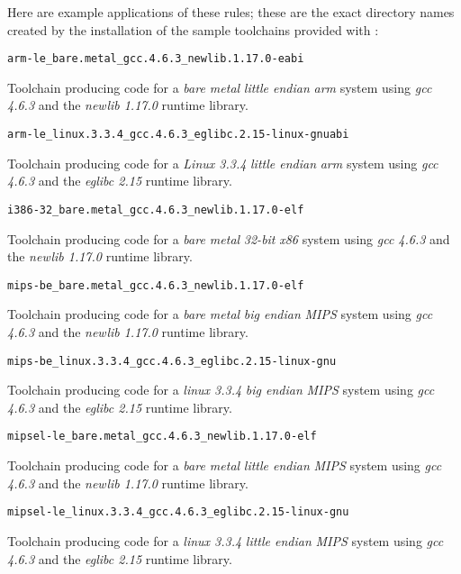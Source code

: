 Here are example applications of these rules; these are the exact
directory names created by the installation of the sample toolchains
provided with \lmsbw:

\begin{description}
\item{\texttt{arm-le\_bare.metal\_gcc.4.6.3\_newlib.1.17.0-eabi}}

  Toolchain producing code for a \emph{bare metal} \emph{little
    endian} \emph{arm} system using \emph{gcc 4.6.3} and the
  \emph{newlib 1.17.0} runtime library.

\item{\texttt{arm-le\_linux.3.3.4\_gcc.4.6.3\_eglibc.2.15-linux-gnuabi}}

  Toolchain producing code for a \emph{Linux 3.3.4} \emph{little
    endian} \emph{arm} system using \emph{gcc 4.6.3} and the
  \emph{eglibc 2.15} runtime library.

\item{\texttt{i386-32\_bare.metal\_gcc.4.6.3\_newlib.1.17.0-elf}}

  Toolchain producing code for a \emph{bare metal} \emph{32-bit}
  \emph{x86} system using \emph{gcc 4.6.3} and the \emph{newlib
    1.17.0} runtime library.

\item{\texttt{mips-be\_bare.metal\_gcc.4.6.3\_newlib.1.17.0-elf}}

  Toolchain producing code for a \emph{bare metal} \emph{big endian}
  \emph{MIPS} system using \emph{gcc 4.6.3} and the \emph{newlib
    1.17.0} runtime library.

\item{\texttt{mips-be\_linux.3.3.4\_gcc.4.6.3\_eglibc.2.15-linux-gnu}}

  Toolchain producing code for a \emph{linux 3.3.4} \emph{big
    endian} \emph{MIPS} system using \emph{gcc 4.6.3} and the
  \emph{eglibc 2.15} runtime library.

\item{\texttt{mipsel-le\_bare.metal\_gcc.4.6.3\_newlib.1.17.0-elf}}


  Toolchain producing code for a \emph{bare metal} \emph{little
    endian} \emph{MIPS} system using \emph{gcc 4.6.3} and the
  \emph{newlib 1.17.0} runtime library.

\item{\texttt{mipsel-le\_linux.3.3.4\_gcc.4.6.3\_eglibc.2.15-linux-gnu}}

  Toolchain producing code for a \emph{linux 3.3.4} \emph{little
    endian} \emph{MIPS} system using \emph{gcc 4.6.3} and the
  \emph{eglibc 2.15} runtime library.


\end{description}
